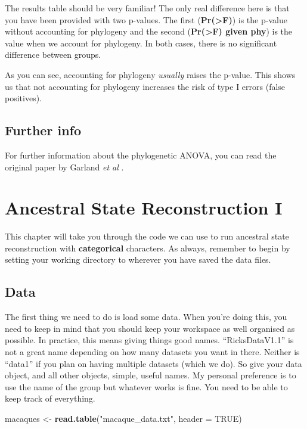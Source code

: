 \documentclass[
]{book}
\newenvironment{Shaded}{\begin{snugshade}}{\end{snugshade}}
\newcommand{\DataTypeTok}[1]{\textcolor[rgb]{0.13,0.29,0.53}{#1}}
\newcommand{\KeywordTok}[1]{\textcolor[rgb]{0.13,0.29,0.53}{\textbf{#1}}}
\newcommand{\NormalTok}[1]{#1}
\newcommand{\OtherTok}[1]{\textcolor[rgb]{0.56,0.35,0.01}{#1}}
\newcommand{\StringTok}[1]{\textcolor[rgb]{0.31,0.60,0.02}{#1}}
\begin{document}
The results table should be very familiar! The only real difference here is that you have been provided with two p-values. The first (\textbf{Pr(\textgreater F)}) is the p-value without accounting for phylogeny and the second (\textbf{Pr(\textgreater F) given phy}) is the value when we account for phylogeny. In both cases, there is no significant difference between groups.

As you can see, accounting for phylogeny \emph{usually} raises the p-value. This shows us that not accounting for phylogeny increases the risk of type I errors (false positives).

\hypertarget{further-info-2}{%
\section{Further info}\label{further-info-2}}

For further information about the phylogenetic ANOVA, you can read the original paper by Garland \emph{et al} \citeyearpar{garland93}.

\hypertarget{asr1}{%
\chapter{Ancestral State Reconstruction I}\label{asr1}}

This chapter will take you through the code we can use to run ancestral state reconstruction with \textbf{categorical} characters. As always, remember to begin by setting your working directory to wherever you have saved the data files.

\hypertarget{data}{%
\section{Data}\label{data}}

The first thing we need to do is load some data. When you're doing this, you need to keep in mind that you should keep your workspace as well organised as possible. In practice, this means giving things good names. ``RicksDataV1.1'' is not a great name depending on how many datasets you want in there. Neither is ``data1'' if you plan on having multiple datasets (which we do). So give your data object, and all other objects, simple, useful names. My personal preference is to use the name of the group but whatever works is fine. You need to be able to keep track of everything.

\begin{Shaded}
\begin{Highlighting}[]
\NormalTok{macaques \textless{}{-}}\StringTok{ }\KeywordTok{read.table}\NormalTok{(}\StringTok{"macaque\_data.txt"}\NormalTok{, }\DataTypeTok{header =} \OtherTok{TRUE}\NormalTok{)}
\end{Highlighting}
\end{Shaded}
\end{document}
